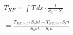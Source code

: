 \( T_{KF} = \int T \, ds \cdot \frac{1}{S_a - S_e} \)  

\( = \frac{T_{KF,out} \cdot S_out - T_{KF,in} \cdot S_in}{S_out - S_in} \)